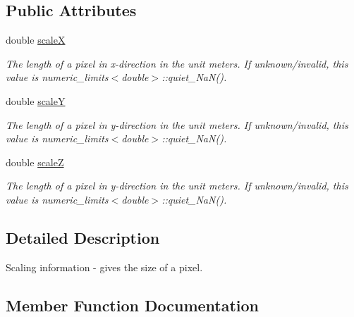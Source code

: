 \subsection*{Public Attributes}
\begin{DoxyCompactItemize}
\item 
\mbox{\label{structlib_c_z_i_1_1_scaling_info_ad78c8dd0c50767ea6004f513379744a3}} 
double \hyperlink{structlib_c_z_i_1_1_scaling_info_ad78c8dd0c50767ea6004f513379744a3}{scaleX}
\begin{DoxyCompactList}\small\item\em The length of a pixel in x-\/direction in the unit meters. If unknown/invalid, this value is numeric\+\_\+limits$<$double$>$\+::quiet\+\_\+\+Na\+N(). \end{DoxyCompactList}\item 
\mbox{\label{structlib_c_z_i_1_1_scaling_info_a1e3eaed2c197331a7f47db7c6a89d930}} 
double \hyperlink{structlib_c_z_i_1_1_scaling_info_a1e3eaed2c197331a7f47db7c6a89d930}{scaleY}
\begin{DoxyCompactList}\small\item\em The length of a pixel in y-\/direction in the unit meters. If unknown/invalid, this value is numeric\+\_\+limits$<$double$>$\+::quiet\+\_\+\+Na\+N(). \end{DoxyCompactList}\item 
\mbox{\label{structlib_c_z_i_1_1_scaling_info_a51209385ef9ee539c5f1fad0a507f63b}} 
double \hyperlink{structlib_c_z_i_1_1_scaling_info_a51209385ef9ee539c5f1fad0a507f63b}{scaleZ}
\begin{DoxyCompactList}\small\item\em The length of a pixel in y-\/direction in the unit meters. If unknown/invalid, this value is numeric\+\_\+limits$<$double$>$\+::quiet\+\_\+\+Na\+N(). \end{DoxyCompactList}\end{DoxyCompactItemize}


\subsection{Detailed Description}
Scaling information -\/ gives the size of a pixel. 

\subsection{Member Function Documentation}
\mbox{\label{structlib_c_z_i_1_1_scaling_info_ae6d9d5bef578048d6d0ca4ff0891d006}} 
